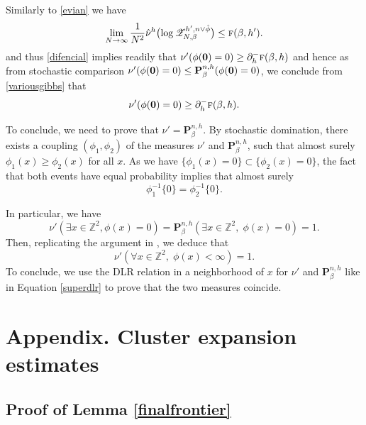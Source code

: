 \documentclass[JEP,XML,SOM,Unicode, NoFloatCountersInSection]{cedram}
\let\mathcal\mathscr
\numberwithin{equation}{section}
\theoremstyle{plain}
\theoremstyle{definition}
\newcommand{\cZ}{{\ensuremath{\mathcal Z}} }
\newcommand{\bP}{{\ensuremath{\mathbf P}} }
\newcommand{\bbZ}{{\ensuremath{\mathbb Z}} }
\newcommand{\gb}{\beta}
\newcommand{\tf}{\textsc{f}}
\begin{document}
Similarly to \eqref{evian} we have
\begin{equation*}
\lim_{N\to \infty}\frac{1}{N^2}\hat \nu^{h}\bigl(\log \cZ^{h',n\vee \hat \phi}_{N,\gb}\bigr)\le \tf(\gb,h').
\end{equation*}
and thus \eqref{difencial} implies readily that
$\nu'(\phi({\bf 0})=0)\ge \partial^-_h\tf(\gb,h)$
and hence as from stochastic comparison $\nu'(\phi({\bf 0})=0)\le \bP^{n,h}_{\gb}(\phi({\bf 0})=0)$, we conclude from \eqref{variousgibbs} that
\[
\nu'(\phi({\bf 0})=0)\ge \partial^-_h\tf(\gb,h).
\]

To conclude, we need to prove that $\nu'=\bP^{n,h}_{\gb}$.
By stochastic domination, there exists a coupling $(\phi_1,\phi_2)$ of the measures $\nu'$ and $\bP^{n,h}_{\gb}$,
such that almost surely $\phi_1(x)\ge \phi_2(x)$ for all $x$. As we have $\{\phi_1(x)=0\}\subset \{\phi_2(x)=0\}$,
the fact that both events have equal probability implies that almost surely
\[
\phi^{-1}_1\{0\}=\phi^{-1}_2\{0\}.
\]

In particular, we have
\begin{equation*}
\nu'(\exists x\in \bbZ^2, \phi(x)=0)= \bP^{n,h}_{\gb}(\exists x\in \bbZ^2,\; \phi(x)=0)=1.
\end{equation*}
Then, replicating the argument in \cite[\S 5]{cf:GL}, we deduce that
\begin{equation*}
\nu'(\forall x\in \bbZ^2,\; \phi(x)<\infty)=1.
\end{equation*}
To conclude, we use the DLR relation in a neighborhood of $x$ for $\nu'$ and $\bP^{n,h}_{\gb}$ like in Equation \eqref{superdlr} to prove that the two measures coincide.

\appendix

\section*{Appendix. Cluster expansion estimates}
\label{apclus}

\subsection{Proof of Lemma \ref{finalfrontier}}\label{pfinal}
\end{document}
